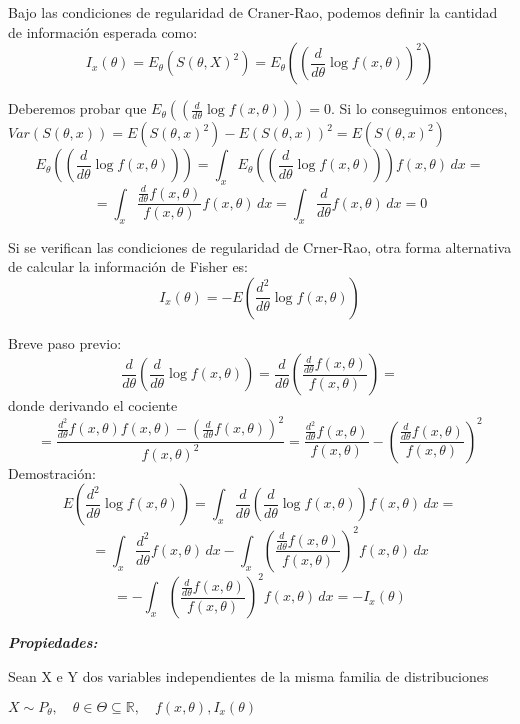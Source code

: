 Bajo las condiciones de regularidad de Craner-Rao, podemos definir la cantidad
de información esperada como:
\[
    I_x(\theta)=E_\theta(S(\theta,X)^2)=E_\theta\left(\left(\frac{d}{d \theta} \log f(x,\theta)\right)^2\right)
\]

\begin{proofs}
    Deberemos probar que $E_\theta(\left(\frac{d}{d \theta} \log f(x,\theta)\right))=0$. Si lo conseguimos entonces, $Var(S(\theta,x))=E(S(\theta,x)^2)-E(S(\theta,x))^2=E(S(\theta,x)^2)$
    \[
        E_\theta\left(\left(\frac{d}{d \theta} \log f(x,\theta)\right)\right)=\int_{x} E_\theta\left(\left(\frac{d}{d \theta} \log f(x,\theta)\right)\right)  f(x,\theta) \,dx =
    \]
    \[
        =\int_{x} \frac{\frac{d}{d \theta} f(x,\theta)}{f(x,\theta)}  f(x,\theta) \,dx=\int_{x} \frac{d}{d \theta} f(x,\theta) \,dx = 0
    \]
\end{proofs}

Si se verifican las condiciones de regularidad de Crner-Rao, otra forma alternativa de calcular la información de Fisher es:
\[
    I_x(\theta)=-E\left(\frac{d^2}{d \theta} \log f(x,\theta)\right)
\]

\begin{proofs}
    Breve paso previo:
    \[
        \frac{d}{d \theta}\left(\frac{d}{d \theta} \log f(x,\theta)\right)=\frac{d}{d \theta}\left(\frac{\frac{d}{d \theta} f(x,\theta)}{f(x,\theta)}\right)=
    \]
    donde derivando el cociente
    \[
        =\frac{\frac{d^2}{d \theta} f(x,\theta) f(x,\theta) -\left(\frac{d}{d \theta} f(x,\theta)\right)^2}{f(x,\theta)^2}=\frac{\frac{d^2}{d \theta} f(x,\theta)}{f(x,\theta)} -\left(\frac{\frac{d}{d \theta} f(x,\theta)}{f(x,\theta)}\right)^2
    \]
    Demostración:
    \[
        E(\frac{d^2}{d \theta} \log f(x,\theta))=\int_{x} \frac{d}{d \theta}\left(\frac{d}{d \theta} \log f(x,\theta)\right)  f(x,\theta) \,dx =
    \]
    \[
        =\int_{x} \frac{d^2}{d \theta} f(x, \theta) \,dx - \int_{x}\left(\frac{\frac{d}{d \theta} f(x,\theta)}{f(x,\theta)}\right)^2  f(x,\theta) \,dx
    \]
    \[
        = -\int_{x}(\frac{\frac{d}{d \theta} f(x,\theta)}{f(x,\theta)})^2  f(x,\theta) \,dx=-I_x(\theta)
    \]
\end{proofs}

\textbf{\textit{Propiedades:}}

Sean X e Y dos variables independientes de la misma familia de distribuciones

$X \sim P_\theta, \quad \theta \in \Theta \subseteq \mathbb{R}, \quad f(x,\theta), I_x(\theta)$

